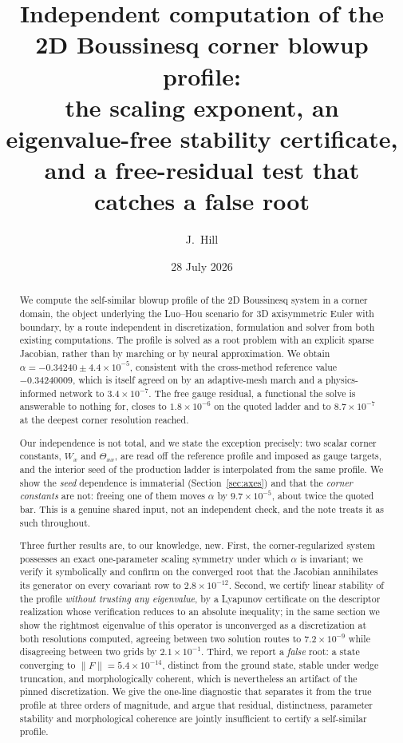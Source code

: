 \documentclass[11pt]{article}
\title{Independent computation of the 2D Boussinesq corner blowup profile:\\
the scaling exponent, an eigenvalue-free stability certificate,\\
and a free-residual test that catches a false root}
\author{J.~Hill}
\date{28 July 2026}
\begin{document}
\maketitle

\begin{abstract}
We compute the self-similar blowup profile of the 2D Boussinesq system in a corner
domain, the object underlying the Luo--Hou scenario for 3D axisymmetric Euler with
boundary, by a route independent in discretization, formulation and solver from both
existing computations. The profile is solved as a root problem with an explicit sparse
Jacobian, rather than by marching or by neural approximation. We obtain
$\alpha = -0.34240 \pm 4.4\times10^{-5}$, consistent with the cross-method reference
value $-0.34240009$, which is itself agreed on by an adaptive-mesh march and a
physics-informed network to $3.4\times10^{-7}$. The free gauge residual, a functional
the solve is answerable to nothing for, closes to $1.8\times10^{-6}$ on the quoted
ladder and to $8.7\times10^{-7}$ at the deepest corner resolution reached.

Our independence is not total, and we state the exception precisely: two scalar corner
constants, $W_x$ and $\Theta_{xx}$, are read off the reference profile and imposed as
gauge targets, and the interior seed of the production ladder is interpolated from the
same profile. We show the \emph{seed} dependence is immaterial (Section~\ref{sec:axes})
and that the \emph{corner constants} are not: freeing one of them moves $\alpha$ by
$9.7\times10^{-5}$, about twice the quoted bar. This is a genuine shared input, not an
independent check, and the note treats it as such throughout.

Three further results are, to our knowledge, new. First, the corner-regularized system
possesses an exact one-parameter scaling symmetry under which $\alpha$ is invariant; we
verify it symbolically and confirm on the converged root that the Jacobian annihilates
its generator on every covariant row to $2.8\times10^{-12}$. Second, we certify linear
stability of the profile \emph{without trusting any eigenvalue}, by a Lyapunov
certificate on the descriptor realization whose verification reduces to an absolute
inequality; in the same section we show the rightmost eigenvalue of this operator is
unconverged as a discretization at both resolutions computed, agreeing between two
solution routes to $7.2\times10^{-9}$ while disagreeing between two grids by
$2.1\times10^{-1}$. Third, we report a \emph{false} root: a state converging to
$\|F\| = 5.4\times10^{-14}$, distinct from the ground state, stable under wedge
truncation, and morphologically coherent, which is nevertheless an artifact of the
pinned discretization. We give the one-line diagnostic that separates it from the true
profile at three orders of magnitude, and argue that residual, distinctness, parameter
stability and morphological coherence are jointly insufficient to certify a
self-similar profile.
\end{abstract}
\end{document}
